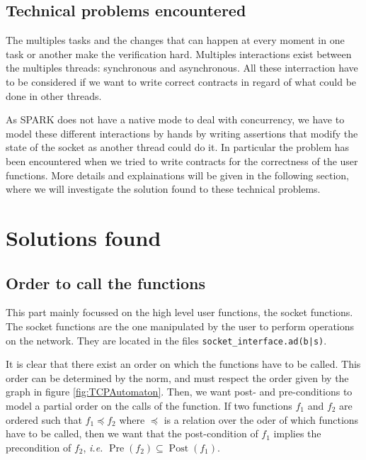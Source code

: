 \documentclass[a4paper, 10pt]{article}
\DeclareMathOperator{\Pre}{Pre}
\DeclareMathOperator{\Post}{Post}
\begin{document}
    \subsection{Technical problems encountered}

    The multiples tasks and the changes that can happen at every moment in one
    task or another make the verification hard. Multiples interactions exist
    between the multiples threads: synchronous and asynchronous.
    All these interraction have to be considered if we want to write correct contracts
    in regard of what could be done in other threads.

    As SPARK does not have a native mode to deal with concurrency, we have to
    model these different interactions by hands by writing assertions that
    modify the state of the socket as another thread could do it. In particular
    the problem has been encountered when we tried to write contracts for the correctness
    of the user functions. More details and explainations will be given in the following
    section, where we will investigate the solution found to these technical problems.

    \section{Solutions found}

    \subsection{Order to call the functions}

    This part mainly focussed on the high level user functions, the socket functions.
    The socket functions are the one manipulated by the user to perform operations on
    the network. They are located in the files \texttt{socket\_interface.ad(b|s)}.

    It is clear that there exist an order on which the functions have to be called.
    This order can be determined by the norm, and must respect the order given by the
    graph in figure \ref{fig:TCPAutomaton}.
    Then, we want post- and pre-conditions to model a partial order on the calls of the function.
    If two functions $f_1$ and $f_2$ are ordered such that $f_1 \preceq f_2$ where $\preceq$ is
    a relation over the oder of which functions have to be called, then we want that the
    post-condition of $f_1$ implies the precondition of $f_2$, \textit{i.e.} $\Pre(f_2) \subseteq \Post(f_1)$.
    
\end{document}
